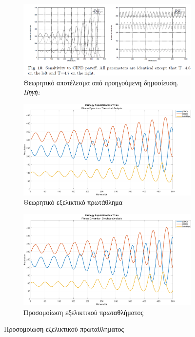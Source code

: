\documentclass[12pt]{report}
\begin{document}
\begin{figure}[htbp]
    \centering

    \begin{subfigure}[b]{0.5\linewidth}
        \centering
        \includegraphics[width=\linewidth]{Figures Fitness Dynamics/10.png}
        \caption{Θεωρητικό αποτέλεσμα από προηγούμενη δημοσίευση. \textit{Πηγή:} \protect\cite{mathieu1999}}
        \label{fig:fig_fit_10_a}
    \end{subfigure}
    \hfill
    \begin{subfigure}[b]{0.5\linewidth}
        \centering
        \includegraphics[width=\linewidth]{Figures Fitness Dynamics/example10a.png}
        \caption{Θεωρητικό εξελικτικό πρωτάθλημα}
        \label{fig:fig_fit_10a_b}
    \end{subfigure}
    \hfill
    \begin{subfigure}[b]{0.5\linewidth}
        \centering
        \includegraphics[width=\linewidth]{Figures Fitness Dynamics/example10a-sim.png}
        \caption{Προσομοίωση εξελικτικού πρωταθλήματος}
        \label{fig:fig_fit_10a_c}
        

\end{subfigure}
\end{figure}
\end{document}
